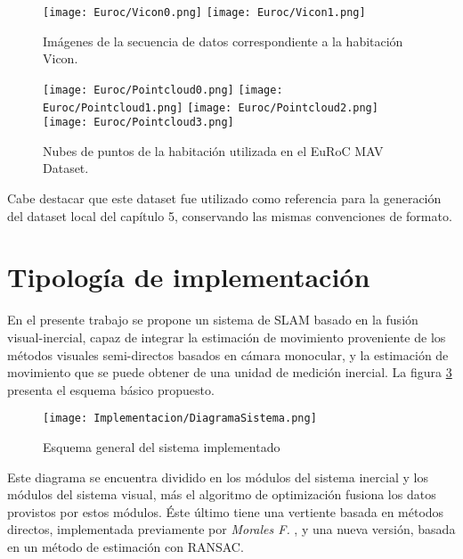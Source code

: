 \begin{figure}[H]
	\centering
	\texttt{[image: Euroc/Vicon0.png]}
	\texttt{[image: Euroc/Vicon1.png]}
	\caption[Imágenes de la secuencia de datos correspondiente a la habitación Vicon]{Imágenes de la secuencia de datos correspondiente a la habitación Vicon.}
	\label{fig:vicon}
\end{figure}


\begin{figure}[H]
	\centering
	\texttt{[image: Euroc/Pointcloud0.png]}
	\texttt{[image: Euroc/Pointcloud1.png]}
	\texttt{[image: Euroc/Pointcloud2.png]}
	\texttt{[image: Euroc/Pointcloud3.png]}
	\caption[Nubes de puntos de la habitación utilizada en el EuRoC MAV Dataset]{Nubes de puntos de la habitación utilizada en el EuRoC MAV Dataset.}
	\label{fig:pointcloudEuroc}
\end{figure}

Cabe destacar que este dataset fue utilizado como referencia para la generación del dataset local del capítulo 5, conservando las mismas convenciones de formato.

\section{Tipología de implementación}

En el presente trabajo se propone un sistema de SLAM basado en la fusión visual-inercial,  capaz de integrar  la estimación de movimiento  proveniente de los métodos visuales semi-directos basados en cámara monocular, y la estimación de movimiento que se puede obtener de una unidad de medición inercial. La figura \ref{fig:esquemaGeneral} presenta el esquema básico propuesto.

\begin{figure}[H]
	\centering
	\texttt{[image: Implementacion/DiagramaSistema.png]}
	\caption[Esquema general del sistema implementado]{Esquema general del sistema implementado}
	\label{fig:esquemaGeneral}
\end{figure}

Este diagrama se encuentra dividido en los módulos del sistema inercial y los módulos del sistema visual, más el algoritmo de optimización fusiona  los datos provistos por estos módulos. Éste último tiene una vertiente basada en métodos directos, implementada previamente por \textit{Morales F.} \cite{fabio}, y una nueva versión, basada en un método de estimación con RANSAC.

